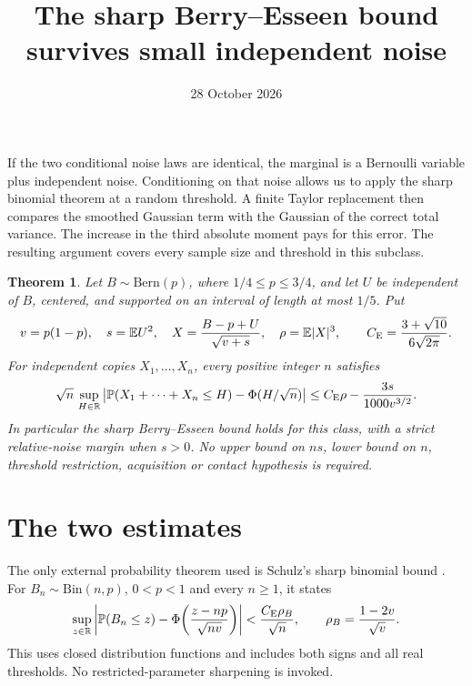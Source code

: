 \documentclass[11pt,a4paper]{article}
\title{The sharp Berry--Esseen bound survives small independent noise}
\author{}\date{28 October 2026}
\newcommand{\E}{\mathbb E}\newcommand{\Pp}{\mathbb P}
\newcommand{\CE}{C_{\rm E}}
\newtheorem{theorem}{Theorem}\newtheorem{lemma}[theorem]{Lemma}
\begin{document}
\maketitle

If the two conditional noise laws are identical, the marginal is a
Bernoulli variable plus independent noise. Conditioning on that noise
allows us to apply the sharp binomial theorem at a random threshold.
A finite Taylor replacement then compares the smoothed Gaussian term
with the Gaussian of the correct total variance. The increase in the
third absolute moment pays for this error. The resulting argument covers
every sample size and threshold in this subclass.

\begin{theorem}\label{thm:closure}
Let $B\sim\mathrm{Bern}(p)$, where $1/4\le p\le3/4$, and let $U$
be independent of $B$, centered, and supported on an interval of length
at most $1/5$. Put
\[
 v=p(1-p),\quad s=\E U^2,\quad
 X=\frac{B-p+U}{\sqrt{v+s}},\quad \rho=\E|X|^3,\qquad
 \CE=\frac{3+\sqrt{10}}{6\sqrt{2\pi}}.
\]
For independent copies $X_1,\ldots,X_n$, every positive integer $n$ satisfies
\begin{equation}\label{eq:main}
 \sqrt n\,\sup_{H\in\mathbb R}
 \left|\Pp(X_1+\cdots+X_n\le H)-\Phi(H/\sqrt n)\right|
 \le \CE\rho-\frac{3s}{1000v^{3/2}}.
\end{equation}
In particular the sharp Berry--Esseen bound holds for this class, with
a strict relative-noise margin when $s>0$. No upper bound on $ns$,
lower bound on $n$, threshold restriction, acquisition or contact
hypothesis is required.
\end{theorem}

\section{The two estimates}
The only external probability theorem used is Schulz's sharp binomial
bound \cite[Theorem 1, printed p.~1]{Schulz}. For $B_n\sim\mathrm{Bin}(n,p)$,
$0<p<1$ and every $n\ge1$, it states
\begin{equation}\label{eq:schulz}
 \sup_{z\in\mathbb R}
 \left|\Pp(B_n\le z)-\Phi\!\left(\frac{z-np}{\sqrt{nv}}\right)\right|
 <\frac{\CE\rho_B}{\sqrt n},
 \qquad \rho_B=\frac{1-2v}{\sqrt v}.
\end{equation}
This uses closed distribution functions and includes both signs and all
real thresholds. No restricted-parameter sharpening is invoked.
\end{document}
